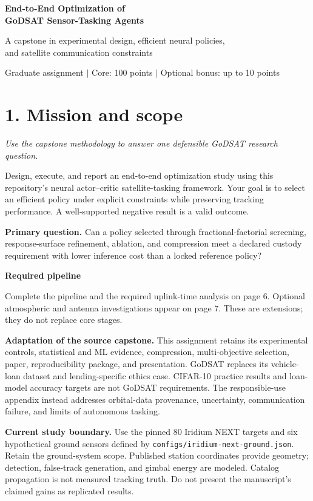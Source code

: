 \documentclass[11pt,letterpaper]{article}
\newcommand{\pageheading}[2]{\section*{\color{navy}#1}\textit{#2}\par}
\newcommand{\code}[1]{\texttt{\small #1}}
\begin{document}
\begin{center}
{\LARGE\bfseries\color{navy} End-to-End Optimization of\\GoDSAT Sensor-Tasking Agents}\par\medskip
{\large A capstone in experimental design, efficient neural policies,\\and satellite communication constraints}\par\medskip
Graduate assignment $\mid$ Core: 100 points $\mid$ Optional bonus: up to 10 points
\end{center}
\pageheading{1. Mission and scope}{Use the capstone methodology to answer one defensible GoDSAT research question.}
Design, execute, and report an end-to-end optimization study using this repository's neural actor--critic satellite-tasking framework. Your goal is to select an efficient policy under explicit constraints while preserving tracking performance. A well-supported negative result is a valid outcome.

\textbf{Primary question.} Can a policy selected through fractional-factorial screening, response-surface refinement, ablation, and compression meet a declared custody requirement with lower inference cost than a locked reference policy?

\textbf{Required pipeline}
\begin{center}
\end{center}
Complete the pipeline and the required uplink-time analysis on page 6. Optional atmospheric and antenna investigations appear on page 7. These are extensions; they do not replace core stages.

\textbf{Adaptation of the source capstone.} This assignment retains its experimental controls, statistical and ML evidence, compression, multi-objective selection, paper, reproducibility package, and presentation. GoDSAT replaces its vehicle-loan dataset and lending-specific ethics case. CIFAR-10 practice results and loan-model accuracy targets are not GoDSAT requirements. The responsible-use appendix instead addresses orbital-data provenance, uncertainty, communication failure, and limits of autonomous tasking.

\textbf{Current study boundary.} Use the pinned 80 Iridium NEXT targets and six hypothetical ground sensors defined by \code{configs/iridium-next-ground.json}. Retain the ground-system scope. Published station coordinates provide geometry; detection, false-track generation, and gimbal energy are modeled. Catalog propagation is not measured tracking truth. Do not present the manuscript's claimed gains as replicated results.
\end{document}
